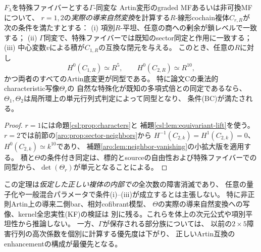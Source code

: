 \begin{theorem}[混合族の低rotation底変更に関する条件付き対称性定理]
\label{csl:thm:conditional-bc}
$F_\lambda$を特殊ファイバーとする$\Gamma$-同変な
Artin変形のgraded MFあるいは非可換MFについて、
$r=1,2$の\emph{実際の導来自然変換}を計算する$R$-線形cochain複体$C_{r,R}$が
次の条件を満たすとする：
(i) 項別$R$-平坦、任意の商への剰余が鎖レベルで一致する；
(ii) $\Gamma$同変で、特殊ファイバーでは既知のsector同定と作用に一致する；
(iii) 中心変数$v$による積が$C_{1,R}$の互換な閉元を与える。
このとき、任意の$R$に対し
\[
 H^0(C_{1,R})\simeq R^5,\qquad
 H^0(C_{2,R})\simeq R^{10},
 \tag{CSL3}\label{csl:eq:bc}
\]
かつ両者のすべてのArtin底変更が同型である。
特に論文Cの乗法的characteristic写像$\Theta_r$の
自然な特殊化が既知の多項式倍との同定であるなら、
$\Theta_1,\Theta_2$は局所環上の単元行列式判定によって同型となり、
条件(BC)が満たされる。
\end{theorem}
\begin{proof}
$r=1$には命題\ref{csl:prop:characters}と
補題\ref{csl:lem:equivariant-lift}を使う。
$r=2$では前節の\ref{aro:prop:sector-neighbors}から
$H^{-1}(C_{2,k})=H^1(C_{2,k})=0$、
$H^0(C_{2,k})\simeq k^{10}$であり、
補題\ref{aro:lem:neighbor-vanishing}の小拡大版を適用する。
積と$\Theta$の条件付き同定は、標的とsourceの自由性および特殊ファイバーでの同型から、$\det(\Theta_r)$が単元となることによる。
\end{proof}

\begin{remark}\label{csl:rem:scope}
この定理は\emph{仮定した正しい複体の内部での}全次数の障害消滅であり、
任意の量子化や一般混合パラメータで条件(i)--(iii)が成立するとは主張しない。
特に非正則Artin上の導来二側bar、相対cofibrant模型、
$\Theta$の実際の導来自然変換への写像、kernel全忠実性(KF)の検証は
別に残る。これらを体上の次元公式や項別平坦性から推論しない。
一方、$\Gamma$が保存される部分族については、
以前の$2\times5$障害行列の高次係数を個別に計算する優先度は下がり、
正しいArtin互換のenhancementの構成が最優先となる。
\end{remark}
